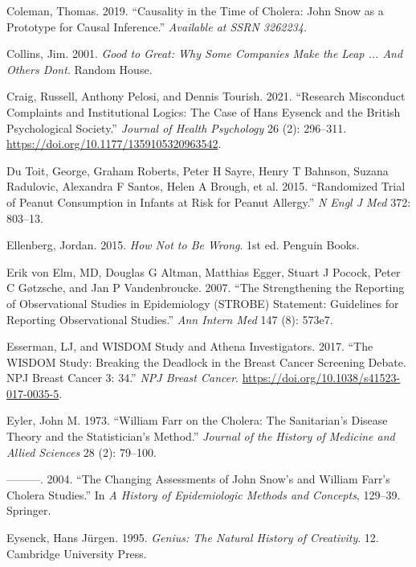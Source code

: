 \documentclass[
  10ptls,
  b5paper]{book}
\newlength{\cslhangindent}
\newenvironment{CSLReferences}[2] %
 {\begin{list}{}{%
  \setlength{\itemindent}{0pt}
  \setlength{\leftmargin}{0pt}
  \setlength{\parsep}{0pt}
  \ifodd #1
   \setlength{\leftmargin}{\cslhangindent}
   \setlength{\itemindent}{-1\cslhangindent}
  \fi
  \setlength{\itemsep}{#2\baselineskip}}}
 {\end{list}}
\begin{document}
\begin{CSLReferences}{1}{0}
Coleman, Thomas. 2019. {``Causality in the Time of Cholera: John {S}now as a Prototype for Causal Inference.''} \emph{Available at SSRN 3262234}.

Collins, Jim. 2001. \emph{Good to Great: Why Some Companies Make the Leap ... And Others Dont}. Random House.

Craig, Russell, Anthony Pelosi, and Dennis Tourish. 2021. {``Research Misconduct Complaints and Institutional Logics: The Case of Hans Eysenck and the British Psychological Society.''} \emph{Journal of Health Psychology} 26 (2): 296--311. \url{https://doi.org/10.1177/1359105320963542}.

Du Toit, George, Graham Roberts, Peter H Sayre, Henry T Bahnson, Suzana Radulovic, Alexandra F Santos, Helen A Brough, et al. 2015. {``Randomized Trial of Peanut Consumption in Infants at Risk for Peanut Allergy.''} \emph{N Engl J Med} 372: 803--13.

Ellenberg, Jordan. 2015. \emph{How Not to Be Wrong}. 1st ed. Penguin Books.

Erik von Elm, MD, Douglas G Altman, Matthias Egger, Stuart J Pocock, Peter C Gøtzsche, and Jan P Vandenbroucke. 2007. {``The Strengthening the Reporting of Observational Studies in Epidemiology (STROBE) Statement: Guidelines for Reporting Observational Studies.''} \emph{Ann Intern Med} 147 (8): 573e7.

Esserman, LJ, and WISDOM Study and Athena Investigators. 2017. {``The WISDOM Study: Breaking the Deadlock in the Breast Cancer Screening Debate. NPJ Breast Cancer 3: 34.''} \emph{NPJ Breast Cancer}. \url{https://doi.org/10.1038/s41523-017-0035-5}.

Eyler, John M. 1973. {``William Farr on the Cholera: The Sanitarian's Disease Theory and the Statistician's Method.''} \emph{Journal of the History of Medicine and Allied Sciences} 28 (2): 79--100.

---------. 2004. {``The Changing Assessments of John Snow's and William Farr's Cholera Studies.''} In \emph{A History of Epidemiologic Methods and Concepts}, 129--39. Springer.

Eysenck, Hans Jürgen. 1995. \emph{Genius: The Natural History of Creativity}. 12. Cambridge University Press.


\end{CSLReferences}
\end{document}
